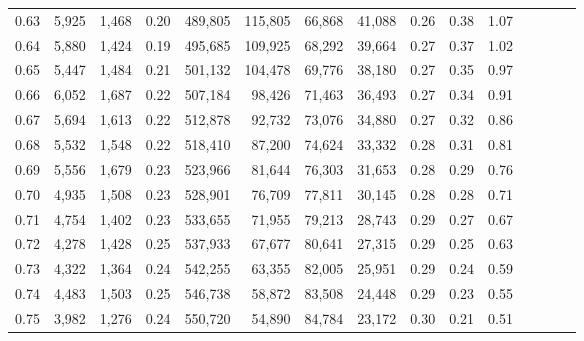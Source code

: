 \begin{tabular}{rrrcrrrrrrrrrrr}
0.63 &   5,925 &  1,468 &                                       0.20 &  489,805 &  115,805 &   66,868 &   41,088 &  0.26 &  0.38 &                         1.07 \\
0.64 &   5,880 &  1,424 &                                       0.19 &  495,685 &  109,925 &   68,292 &   39,664 &  0.27 &  0.37 &                         1.02 \\
0.65 &   5,447 &  1,484 &                                       0.21 &  501,132 &  104,478 &   69,776 &   38,180 &  0.27 &  0.35 &                         0.97 \\
0.66 &   6,052 &  1,687 &                                       0.22 &  507,184 &   98,426 &   71,463 &   36,493 &  0.27 &  0.34 &                         0.91 \\
0.67 &   5,694 &  1,613 &                                       0.22 &  512,878 &   92,732 &   73,076 &   34,880 &  0.27 &  0.32 &                         0.86 \\
0.68 &   5,532 &  1,548 &                                       0.22 &  518,410 &   87,200 &   74,624 &   33,332 &  0.28 &  0.31 &                         0.81 \\
0.69 &   5,556 &  1,679 &                                       0.23 &  523,966 &   81,644 &   76,303 &   31,653 &  0.28 &  0.29 &                         0.76 \\
0.70 &   4,935 &  1,508 &                                       0.23 &  528,901 &   76,709 &   77,811 &   30,145 &  0.28 &  0.28 &                         0.71 \\
0.71 &   4,754 &  1,402 &                                       0.23 &  533,655 &   71,955 &   79,213 &   28,743 &  0.29 &  0.27 &                         0.67 \\
0.72 &   4,278 &  1,428 &                                       0.25 &  537,933 &   67,677 &   80,641 &   27,315 &  0.29 &  0.25 &                         0.63 \\
0.73 &   4,322 &  1,364 &                                       0.24 &  542,255 &   63,355 &   82,005 &   25,951 &  0.29 &  0.24 &                         0.59 \\
0.74 &   4,483 &  1,503 &                                       0.25 &  546,738 &   58,872 &   83,508 &   24,448 &  0.29 &  0.23 &                         0.55 \\
0.75 &   3,982 &  1,276 &                                       0.24 &  550,720 &   54,890 &   84,784 &   23,172 &  0.30 &  0.21 &                         0.51 \\

\end{tabular}
